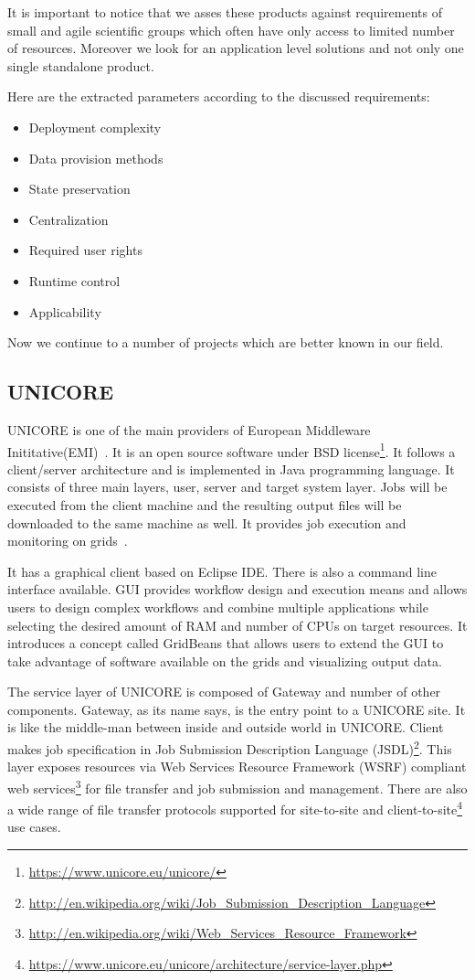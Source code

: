 It is important to notice that we asses these products against 
requirements of small and agile scientific groups which often have only access to limited number of resources.
Moreover we look for an application level solutions and not only one single standalone product.

Here are the extracted parameters according to the discussed requirements:

\begin{itemize}
\item Deployment complexity
\item Data provision methods
\item State preservation
\item Centralization
\item Required user rights
\item Runtime control
\item Applicability
\end{itemize}
Now we continue to a number of projects which are better known in our field.
\subsection{UNICORE}
UNICORE is one of the main providers of European Middleware Inititative(EMI)~\cite{EMI}. 
It is an open source software under BSD license\footnote{\url{https://www.unicore.eu/unicore/}}.
It follows a client/server architecture and is implemented in Java programming language.
It consists of three main layers, user, server and target system layer. 
Jobs will be executed from the client machine and the resulting output files will be downloaded
to the same machine as well. It provides job execution and monitoring on grids~\cite{unicore_wp}.

It has a graphical client based on Eclipse IDE. There
is also a command line interface available. GUI provides workflow design and execution means and 
allows users to design complex workflows and combine multiple applications while selecting
the desired amount of RAM and number of CPUs on target resources. It introduces a concept 
called GridBeans that allows users to extend the GUI to take advantage of software available on
the grids and visualizing output data.

The service layer of UNICORE is composed of Gateway and number of other components. Gateway, as
its name says, is the entry point to a UNICORE site. It is like the middle-man between inside
and outside world in UNICORE. Client makes job specification in Job Submission Description Language
 (JSDL)\footnote{\url{http://en.wikipedia.org/wiki/Job_Submission_Description_Language}}.
 This layer exposes resources via Web Services Resource Framework (WSRF) compliant web 
 services\footnote{\url{http://en.wikipedia.org/wiki/Web_Services_Resource_Framework}}
 for file transfer and job submission and management. 
 There are also a wide range of file transfer
 protocols supported for site-to-site and 
 client-to-site\footnote{\url{https://www.unicore.eu/unicore/architecture/service-layer.php}} use cases.

